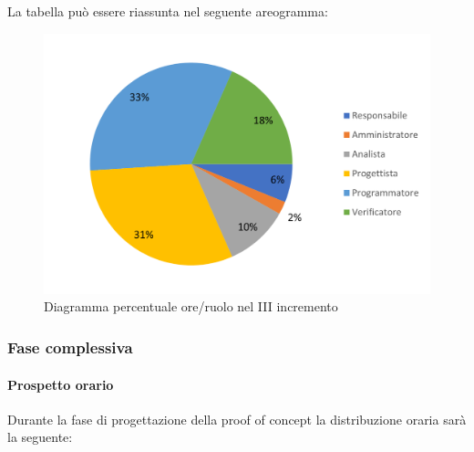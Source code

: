La tabella può essere riassunta nel seguente areogramma:
\begin{figure}[H]
	\centering
	\includegraphics[width=0.8\linewidth]{res/images/preventivo/dettaglio_poc/3-2.png}
	\caption{Diagramma percentuale ore/ruolo nel III incremento}
	\label{fig:diagramma costi ruolo III incremento}
\end{figure}

\subsubsection{Fase complessiva}
\paragraph{Prospetto orario}
Durante la fase di progettazione della proof of concept la distribuzione oraria sarà la seguente:

